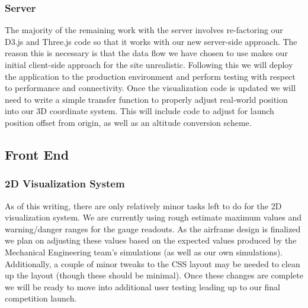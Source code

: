 \documentclass[journal,10pt,onecolumn,compsoc]{IEEEtran}
\begin{document}
		\subsubsection{Server}
      The majority of the remaining work with the server involves re-factoring our D3.js and Three.js code so that it works with our new server-side approach.
      The reason this is necessary is that the data flow we have chosen to use makes our initial client-side approach for the site unrealistic.
			Following this we will deploy the application to the production environment and perform testing with respect to performance and connectivity.
			Once the visualization code is updated we will need to write a simple transfer function to properly adjust real-world position into our 3D coordinate system.
      This will include code to adjust for launch position offset from origin, as well as an altitude conversion scheme.
	
	\subsection{Front End}
	
		\subsubsection{2D Visualization System}
			As of this writing, there are only relatively minor tasks left to do for the 2D visualization system. 
			We are currently using rough estimate maximum values and warning/danger ranges for the gauge readouts. 
			As the airframe design is finalized we plan on adjusting these values based on the expected values produced by the Mechanical Engineering team's simulations (as well as our own simulations).
			Additionally, a couple of minor tweaks to the CSS layout may be needed to clean up the layout (though these should be minimal).
			Once these changes are complete we will be ready to move into additional user testing leading up to our final competition launch.
		
\end{document}

